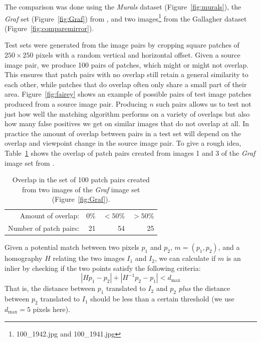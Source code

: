 \documentclass{article}
\begin{document}
The comparison was done using the \emph{Murals} dataset 
(Figure~\ref{fig:murals}), the \emph{Graf} set (Figure~\ref{fig:Graf}) 
from \cite{mikolajczyk2005performance}, and two 
images\footnote{100\_1942.jpg and 100\_1941.jpg} from the Gallagher 
dataset \cite{gallagher2008} (Figure~\ref{fig:comparemirror}).

Test sets were generated from the image pairs by cropping square patches of
$250\!\times\!250$ pixels with a random vertical and horizontal offset.  
Given a source image pair, we produce 100 pairs of patches, which might or might not overlap.  
This ensures that patch pairs with no overlap still retain a general similarity to each 
other, while patches that do overlap often only share a small 
part of their area. Figure~\ref{fig:fairey} shows an example of 
possible pairs of test image patches produced from a source image pair.  
Producing $n$ such pairs allows us to test not just how well the 
matching algorithm performs on a variety of overlaps but also how many 
false positives we get on similar images that do not overlap at all. In 
practice the amount of overlap between pairs in a test set will depend 
on the overlap and viewpoint change in the source image pair.  To give a 
rough idea, Table~\ref{table:overlap} shows the overlap of patch pairs 
created from images 1 and 3 of the \emph{Graf} image set from 
\cite{mikolajczyk2005performance}.

\begin{table}[htb]
\caption{Overlap in the set of 100 patch pairs created from two images 
of the \emph{Graf} image set (Figure~\ref{fig:Graf}).}
\label{table:overlap}
    \centering
\begin{tabular}{r*{3}{r}}
\hline
    Amount of overlap: & 0\% & $< 50$\% & $> 50$\%  \\
    \noalign{\smallskip}
    Number of patch pairs: & 21 & 54 & 25 \\
    \hline
\end{tabular}
\end{table}

Given a potential match between two pixels $p_1$ and $p_2$, $m = 
\left(p_1, p_2\right)$, and a homography $H$ relating the two images 
$I_1$ and $I_2$, we can calculate if $m$ is an inlier by checking if the 
two points satisfy the following criteria:
\begin{equation*}
\left\vert H p_1 - p_2 \right\vert + \left\vert H^{-1}p_2 - p_1 \right\vert < d_{\max}
\end{equation*}
That is, the distance between $p_1$ translated to $I_2$ and $p_2$ 
\emph{plus} the distance between $p_2$ translated to $I_1$ should be 
less than a certain threshold (we use $d_{\max}=5$ pixels here).
\end{document}
